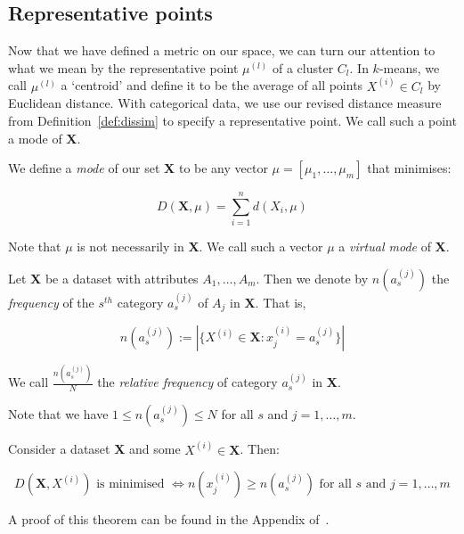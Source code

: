 \subsection{Representative points}\label{subsec:rep-points}

Now that we have defined a metric on our space, we can turn our attention to 
what we mean by the representative point \(\mu^{(l)}\) of a cluster \(C_l\). In 
\(k\)-means, we call \(\mu^{(l)}\) a `centroid' and define it to be the average 
of all points \(X^{(i)} \in C_l\) by Euclidean distance. With categorical data, 
we use our revised distance measure from Definition~\ref{def:dissim} to specify 
a representative point. We call such a point a mode of \textbf{X}.\\

\begin{definition}\label{def:mode}
    We define a \emph{mode} of our set \textbf{X} to be any vector \(\mu = 
    [\mu_1, \ldots, \mu_m]\) that minimises:
	
    \begin{equation}
		D(\textbf{X}, \mu) = \sum_{i=1}^{n} d(X_i, \mu)
	\end{equation}
	
    Note that \(\mu\) is not necessarily in \textbf{X}. We call such a vector
    \(\mu\) a \emph{virtual mode} of \textbf{X}.
\end{definition}

\begin{definition}\label{def:rel-freq}
    Let \textbf{X} be a dataset with attributes \(A_1, \ldots, A_m\). Then we
    denote by \(n(a_s^{(j)})\) the \emph{frequency} of the \(s^{th}\) category 
    \(a_s^{(j)}\) of \(A_j\) in \textbf{X}. That is, 
	
    \[
	    n(a_s^{(j)}) := |{\{X^{(i)} \in \textbf{X}: x_j^{(i)} = a_s^{(j)}\}}|
	\]
	
    We call \(\frac{n(a_s^{(j)})}{N}\) the \emph{relative frequency} of category 
    \(a_s^{(j)}\) in \textbf{X}.
\end{definition}

\begin{remark}
    Note that we have \(1 \le n(a_s^{(j)}) \le N\) for all \(s\) and \(j = 1, 
    \ldots, m\).\\
\end{remark}

\begin{theorem}\label{thm:1}
    Consider a dataset \textbf{X} and some \(X^{(i)} \in \textbf{X}\). Then:
	
    \[
	    D(\textbf{X}, X^{(i)}) \text{ is minimised } \iff n(x_j^{(i)}) \geq 
	    n(a_s^{(j)}) \text{ for all } s \text{ and } j = 1, \ldots, m 
	\]
\end{theorem}
A proof of this theorem can be found in the Appendix of~\cite{Huang98}.\\



